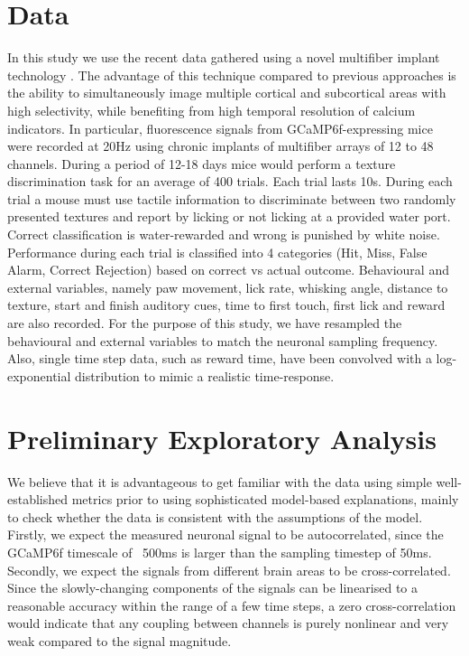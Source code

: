 \documentclass[a4paper,10pt]{article}
\begin{document}
\section{Data}
In this study we use the recent data gathered using a novel multifiber implant technology \cite{sych_high-density_2019}. The advantage of this technique compared to previous approaches is the ability to simultaneously image multiple cortical and subcortical areas with high selectivity, while benefiting from high temporal resolution of calcium indicators. In particular, fluorescence signals from GCaMP6f-expressing mice were recorded at 20Hz using chronic implants of multifiber arrays of 12 to 48 channels. During a period of 12-18 days mice would perform a texture discrimination task for an average of 400 trials. Each trial lasts 10s. During each trial a mouse must use tactile information to discriminate between two randomly presented textures and report by licking or not licking at a provided water port. Correct classification is water-rewarded and wrong is punished by white noise. Performance during each trial is classified into 4 categories (Hit, Miss, False Alarm, Correct Rejection) based on correct vs actual outcome. Behavioural and external variables, namely paw movement, lick rate, whisking angle, distance to texture, start and finish auditory cues, time to first touch, first lick and reward are also recorded. For the purpose of this study, we have resampled the behavioural and external variables to match the neuronal sampling frequency. Also, single time step data, such as reward time, have been convolved with a log-exponential distribution to mimic a realistic time-response.

\section{Preliminary Exploratory Analysis}
We believe that it is advantageous to get familiar with the data using simple well-established metrics prior to using sophisticated model-based explanations, mainly to check whether the data is consistent with the assumptions of the model. Firstly, we expect the measured neuronal signal to be autocorrelated, since the GCaMP6f timescale of ~500ms is larger than the sampling timestep of 50ms. Secondly, we expect the signals from different brain areas to be cross-correlated. Since the slowly-changing components of the signals can be linearised to a reasonable accuracy within the range of a few time steps, a zero cross-correlation would indicate that any coupling between channels is purely nonlinear and very weak compared to the signal magnitude.
\end{document}
